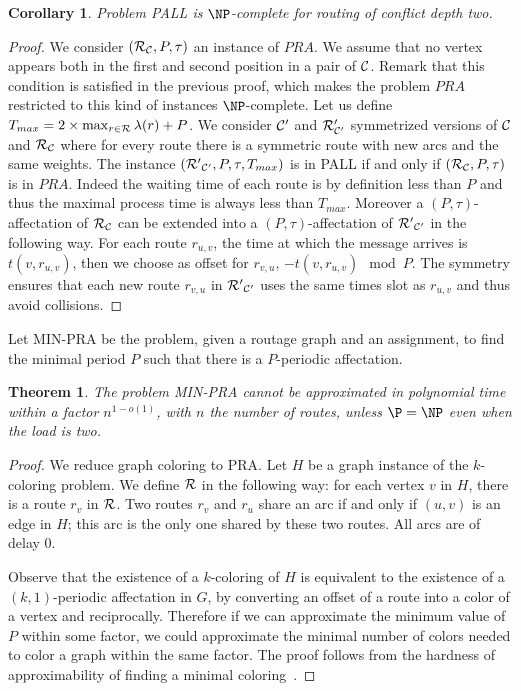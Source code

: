\documentclass[a4paper,10pt]{article}
\newtheorem{theorem}{Theorem}
\newtheorem{corollary}{Corollary}
\begin{document}
\begin{corollary}
Problem PALL is $\NP$-complete for routing of conflict depth two.
\end{corollary}
\begin{proof}
 We consider $({\cal R}_{\cal C},P,\tau)$ an instance of $PRA$. We assume that no vertex appears both in the first and second position in a pair of ${\cal C}$. Remark that this condition is satisfied in the previous proof, which makes the problem $PRA$ restricted to this kind of instances $\NP$-complete. 
 Let us define $T_{max} = 2 \times \max_{r \in {\cal R}} \lambda(r) + P$. We consider ${\cal C}'$ and ${\cal R}'_{\cal C'}$ symmetrized versions of ${\cal C}$ and  ${\cal R}_{\cal C}$ where for every route there is a symmetric route with new arcs and the same weights.
 The instance $({\cal R'}_{\cal C'},P,\tau,T_{max})$ is in PALL if and only if $({\cal R}_{\cal C},P,\tau)$
 is in $PRA$. Indeed the waiting time of each route is by definition less than $P$ and thus the maximal process time is always less than $T_{max}$. Moreover a $(P,\tau)$-affectation of ${\cal R}_{\cal C}$ can be extended into a $(P,\tau)$-affectation of ${\cal R'}_{\cal C'}$ in the following way. For each route $r_{u,v}$, the time at which the message arrives is $t(v,r_{u,v})$, then we choose as offset for $r_{v,u}$, $-t(v,r_{u,v}) \mod P$. The symmetry ensures that each new route $r_{v,u}$ in ${\cal R'}_{\cal C'}$ uses the same times slot as $r_{u,v}$ and thus avoid collisions.
\end{proof}

Let MIN-PRA be the problem, given a routage graph and an assignment, to find the minimal period $P$ such that there is a $P$-periodic affectation. 

\begin{theorem}
 The problem MIN-PRA cannot be approximated in polynomial time within a factor $n^{1-o(1)}$, with $n$ the number of routes, unless $\P = \NP$ even when the load is two.
\end{theorem}

\begin{proof}
 We reduce graph coloring to PRA. Let $H$ be a graph instance of the $k$-coloring problem. 
 We define ${\cal R}$ in the following way: for each vertex $v$ in $H$, there is a route $r_v$ in ${\cal R}$.
 Two routes $r_v$ and $r_u$ share an arc if and only if $(u,v)$ is an edge in $H$; this arc is the only one shared by these two routes.   
 All arcs are of delay $0$. 
 
 Observe that the existence of a $k$-coloring of $H$ is equivalent to the existence of a $(k,1)$-periodic affectation in $G$, 
 by converting an offset of a route into a color of a vertex and reciprocally. Therefore if we can approximate the minimum value of $P$ within some factor, we could approximate the minimal number of colors needed to color a graph within the same factor. The proof follows from the hardness of approximability of finding a minimal coloring~\cite{zuckerman2006linear}.
\end{proof}
\end{document}
